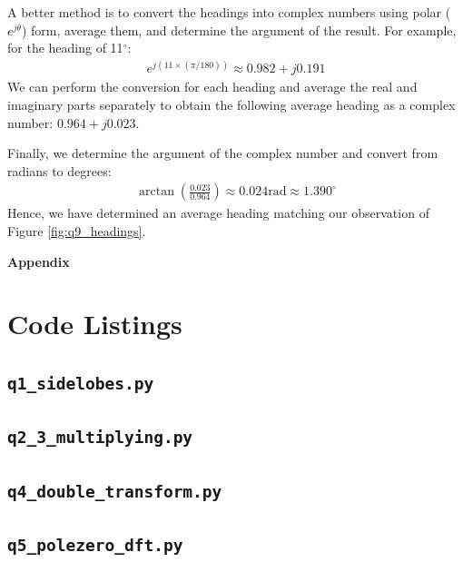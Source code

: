 \documentclass[a4paper, 11pt]{article}
\begin{document}
A better method is to convert the headings into complex numbers using polar
($e^{j\theta}$) form, average them, and determine the argument of the result.
For example, for the heading of 11$^\circ$:
\begin{align*}
    e^{j(11\times(\pi/180))} \approx 0.982+j0.191
\end{align*}
We can perform the conversion for each heading and average the real and
imaginary parts separately to obtain the following average heading as a complex
number: $0.964+j0.023$.

Finally, we determine the argument of the complex number and convert from
radians to degrees:
\begin{align*}
    \arctan(\frac{0.023}{0.964}) \approx 0.024 \text{rad} \approx 1.390^\circ
\end{align*}
Hence, we have determined an average heading matching our observation of Figure
\ref{fig:q9_headings}.

\newpage
\appendix
\begin{center}
    \LARGE{\textbf{Appendix}}
\end{center}

\section{Code Listings}
\subsection{\texttt{q1\_sidelobes.py}}


\newpage
\subsection{\texttt{q2\_3\_multiplying.py}}


\newpage
\subsection{\texttt{q4\_double\_transform.py}}


\newpage
\subsection{\texttt{q5\_polezero\_dft.py}}

\end{document}
